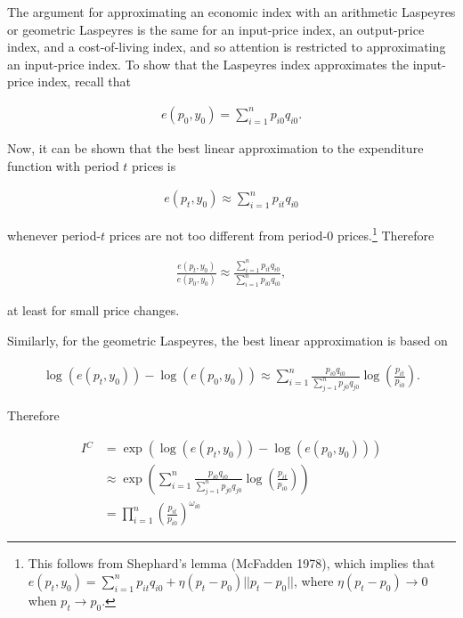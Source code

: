 \documentclass[]{article}
\begin{document}
The argument for approximating an economic index with an arithmetic Laspeyres or geometric Laspeyres is the same for an input-price index, an output-price index, and a cost-of-living index, and so attention is restricted to approximating an input-price index. To show that the Laspeyres index approximates the input-price index, recall that

\begin{align*}
e(p_{0}, y_{0}) = \sum_{i = 1}^{n} p_{i0} q_{i0}.
\end{align*}

Now, it can be shown that the best linear approximation to the expenditure function with period \(t\) prices is

\begin{align*}
e(p_{t}, y_{0}) \approx \sum_{i = 1}^{n} p_{it}q_{i0}
\end{align*}

whenever period-\(t\) prices are not too different from period-0 prices.\footnote{This follows from Shephard's lemma (McFadden 1978), which implies that \(e(p_{t}, y_{0}) = \sum_{i = 1}^{n} p_{it}q_{i0} + \eta(p_{t} - p_{0})||p_{t} - p_{0}||\), where \(\eta(p_{t} - p_{0}) \rightarrow 0\) when \(p_{t} \rightarrow p_{0}\).} Therefore

\begin{align*}
\frac{e(p_{t}, y_{0})}{e(p_{0}, y_{0})} \approx \frac{\sum_{i = 1}^{n} p_{it} q_{i0}}{\sum_{i = 1}^{n} p_{i0} q_{i0}},
\end{align*}

at least for small price changes.

Similarly, for the geometric Laspeyres, the best linear approximation is based on

\begin{align*}
\log(e(p_{t}, y_{0})) - \log(e(p_{0}, y_{0})) \approx \sum_{i = 1}^{n} \frac{p_{i0} q_{i0}}{\sum_{j = 1}^{n} p_{j0} q_{j0}} \log\left(\frac{p_{it}}{p_{i0}} \right).
\end{align*}

Therefore

\begin{align*}
I{^C} &= \exp(\log(e(p_{t}, y_{0})) - \log(e(p_{0}, y_{0}))) \\
&\approx \exp\left( \sum_{i = 1}^{n} \frac{p_{i0} q_{i0}}{\sum_{j = 1}^{n} p_{j0} q_{j0}} \log\left(\frac{p_{it}}{p_{i0}} \right) \right) \\
&= \prod_{i = 1}^{n} \left(\frac{p_{it}}{p_{i0}} \right)^{\omega_{i0}}
\end{align*}
\end{document}
